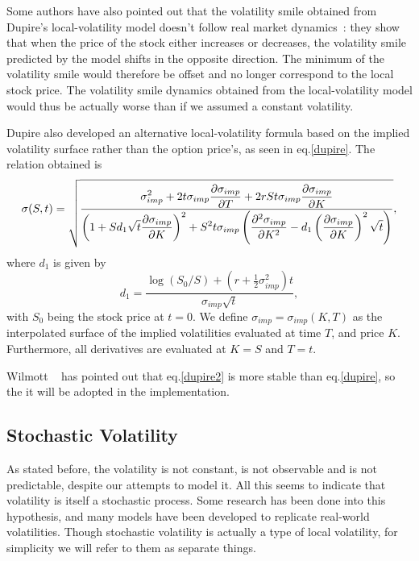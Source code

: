 Some authors have also pointed out that the volatility smile obtained from Dupire's local-volatility model doesn't follow real market dynamics~\cite{Hagan}: they show that when the price of the stock either increases or decreases, the volatility smile predicted by the model shifts in the opposite direction. The minimum of the volatility smile would therefore be offset and no longer correspond to the local stock price. The volatility smile dynamics obtained from the local-volatility model would thus be actually worse than if we assumed a constant volatility.


Dupire also developed an alternative local-volatility formula based on the implied volatility surface rather than the option price's, as seen in eq.\ref{dupire}.
The relation obtained is
\begin{equation}\label{dupire2}
\sigma(S,t)=\sqrt{\frac{\displaystyle\sigma_{imp}^2+2t\sigma_{imp}\pdv{\sigma_{imp}}{T}+2rSt\sigma_{imp}\pdv{\sigma_{imp}}{K}}{\displaystyle\left(1+Sd_1\sqrt{t}\pdv{\sigma_{imp}}{K}\right)^2+S^2t\sigma_{imp}\left(\pdv{^2\sigma_{imp}}{K^2}-d_1\left(\pdv{\sigma_{imp}}{K}\right)^2\sqrt{t}\right)}},
\end{equation}
\noindent where $d_1$ is given by
\begin{equation}
d_1=\frac{\log(S_0/S)+\left(r+\frac{1}{2}\sigma_{imp}^2\right)t}{\sigma_{imp}\sqrt{t}},
\end{equation}
\noindent with $S_0$ being the stock price at $t=0$. We define $\sigma_{imp}=\sigma_{imp}(K,T)$ as the interpolated surface of the implied volatilities evaluated at time $T$, and price $K$. Furthermore, all derivatives are evaluated at $K=S$ and $T=t$.

Wilmott ~\cite{Wilmott3} has pointed out that eq.\eqref{dupire2} is more stable than eq.\eqref{dupire}, so the it will be adopted in the implementation.


\subsection{Stochastic Volatility}
\label{subsection:stochastic volatility}
As stated before, the volatility is not constant, is not observable and is not predictable, despite our attempts to model it. All this seems to indicate that volatility is itself a stochastic process. Some research has been done into this hypothesis, and many models have been developed to replicate real-world volatilities. Though stochastic volatility is actually a type of local volatility, for simplicity we will refer to them as separate things.

